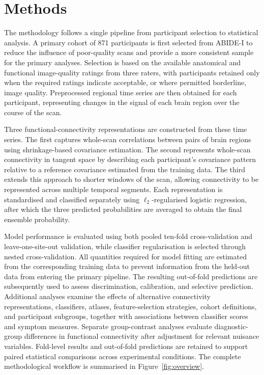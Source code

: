 \section{Methods}
\label{sec:methods}

The methodology follows a single pipeline from participant selection to statistical analysis. A primary cohort of 871 participants is first selected from ABIDE-I to reduce the influence of poor-quality scans and provide a more consistent sample for the primary analyses. Selection is based on the available anatomical and functional image-quality ratings from three raters, with participants retained only when the required ratings indicate acceptable, or where permitted borderline, image quality. Preprocessed regional time series are then obtained for each participant, representing changes in the signal of each brain region over the course of the scan.

Three functional-connectivity representations are constructed from these time series. The first captures whole-scan correlations between pairs of brain regions using shrinkage-based covariance estimation. The second represents whole-scan connectivity in tangent space by describing each participant's covariance pattern relative to a reference covariance estimated from the training data. The third extends this approach to shorter windows of the scan, allowing connectivity to be represented across multiple temporal segments. Each representation is standardised and classified separately using $\ell_2$-regularised logistic regression, after which the three predicted probabilities are averaged to obtain the final ensemble probability.

Model performance is evaluated using both pooled ten-fold cross-validation and leave-one-site-out validation, while classifier regularisation is selected through nested cross-validation. All quantities required for model fitting are estimated from the corresponding training data to prevent information from the held-out data from entering the primary pipeline. The resulting out-of-fold predictions are subsequently used to assess discrimination, calibration, and selective prediction. Additional analyses examine the effects of alternative connectivity representations, classifiers, atlases, feature-selection strategies, cohort definitions, and participant subgroups, together with associations between classifier scores and symptom measures. Separate group-contrast analyses evaluate diagnostic-group differences in functional connectivity after adjustment for relevant nuisance variables. Fold-level results and out-of-fold predictions are retained to support paired statistical comparisons across experimental conditions. The complete methodological workflow is summarised in Figure~\ref{fig:overview}.


